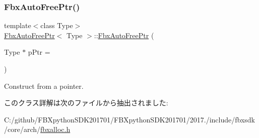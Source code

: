 \subsubsection{\texorpdfstring{Fbx\+Auto\+Free\+Ptr()}{FbxAutoFreePtr()}}
{\footnotesize\ttfamily template$<$class Type$>$ \\
\hyperlink{class_fbx_auto_free_ptr}{Fbx\+Auto\+Free\+Ptr}$<$ Type $>$\+::\hyperlink{class_fbx_auto_free_ptr}{Fbx\+Auto\+Free\+Ptr} (\begin{DoxyParamCaption}\item[{Type $\ast$}]{p\+Ptr = {} }\end{DoxyParamCaption})\hspace{0.3cm}{\ttfamily [explicit]}}



Construct from a pointer. 



このクラス詳解は次のファイルから抽出されました\+:\begin{DoxyCompactItemize}
\item 
C\+:/github/\+F\+B\+Xpython\+S\+D\+K201701/\+F\+B\+Xpython\+S\+D\+K201701/2017./include/fbxsdk/core/arch/\hyperlink{fbxalloc_8h}{fbxalloc.\+h}\end{DoxyCompactItemize}
